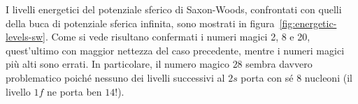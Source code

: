 I livelli energetici del potenziale sferico di Saxon-Woods, confrontati con quelli della buca di potenziale sferica infinita, sono mostrati in figura~\ref{fig:energetic-levels-sw}.
Come si vede risultano confermati i numeri magici 2, 8 e 20, quest’ultimo con maggior nettezza del caso precedente, mentre i numeri magici più alti sono errati.
In particolare, il numero magico $28$ sembra davvero problematico poiché nessuno dei livelli successivi al $2s$ porta con sé $8$ nucleoni (il livello $1f$ ne porta ben $14$!).





















































